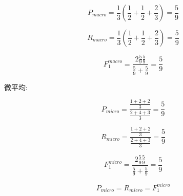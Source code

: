 \[P_{macro} = \frac{1}{3}(\frac{1}{2} + \frac{1}{2} + \frac{2}{3}) = \frac{5}{9}\]

\[R_{macro} = \frac{1}{3}(\frac{1}{2} + \frac{1}{2} + \frac{2}{3}) = \frac{5}{9}\]

\[F_1^{macro} = \frac{2\frac{5}{9}\frac{5}{9}}{\frac{5}{9} + \frac{5}{9}} = \frac{5}{9}\]

微平均:

\[P_{micro} = \frac{\frac{1+2+2}{3}}{\frac{2+4+3}{3}} = \frac{5}{9}\]

\[R_{micro} = \frac{\frac{1+2+2}{3}}{\frac{2+4+3}{3}} = \frac{5}{9}\]

\[F_1^{micro} = \frac{2\frac{5}{9}\frac{5}{9}}{\frac{5}{9} + \frac{5}{9}} = \frac{5}{9}\]

\[P_{micro} = R_{micro} = F_1^{micro}\]





